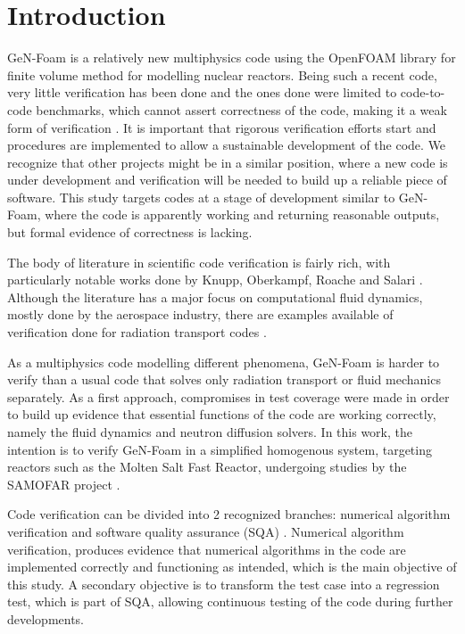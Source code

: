 
\section{Introduction}

GeN-Foam is a relatively new multiphysics code \cite{fiorina_gen-foam:_2015} using the OpenFOAM library for finite volume method \cite{weller_tensorial_1998} for modelling nuclear reactors.
Being such a recent code, very little verification has been done \cite{fiorina_gen-foam:_2015, fiorina_development_2016, fiorina_extension_2017} and the ones done were limited to code-to-code benchmarks, which cannot assert correctness of the code, making it a weak form of verification \cite{oberkampf_role_2003}.
It is important that rigorous verification efforts start and procedures are implemented to allow a sustainable development of the code.
We recognize that other projects might be in a similar position, where a new code is under development and verification will be needed to build up a reliable piece of software.
This study targets codes at a stage of development similar to GeN-Foam, where the code is apparently working and returning reasonable outputs, but formal evidence of correctness is lacking.

The body of literature in scientific code verification is fairly rich, with particularly notable works done by Knupp, Oberkampf, Roache and Salari \cite{oberkampf_verification_2010, knupp_verification_2002, roache_verification_1998}.
Although the literature has a major focus on computational fluid dynamics, mostly done by the aerospace industry, there are examples available of verification done for radiation transport codes \cite{pautz_verification_2001, schunert_two-dimensional_2011, wang_application_2016}.

As a multiphysics code modelling different phenomena, GeN-Foam is harder to verify than a usual code that solves only radiation transport or fluid mechanics separately.
As a first approach, compromises in test coverage were made in order to build up evidence that essential functions of the code are working correctly, namely the fluid dynamics and neutron diffusion solvers.
In this work, the intention is to verify GeN-Foam in a simplified homogenous system, targeting reactors such as the Molten Salt Fast Reactor, undergoing studies by the SAMOFAR project \cite{samofar_paradigm_2015}.

Code verification can be divided into 2 recognized branches: numerical algorithm verification and software quality assurance (SQA) \cite[page 47]{oberkampf_verification_2010}.
Numerical algorithm verification, produces evidence that numerical algorithms in the code are implemented correctly and functioning as intended, which is the main objective of this study.
A secondary objective is to transform the test case into a regression test, which is part of SQA, allowing continuous testing of the code during further developments.
